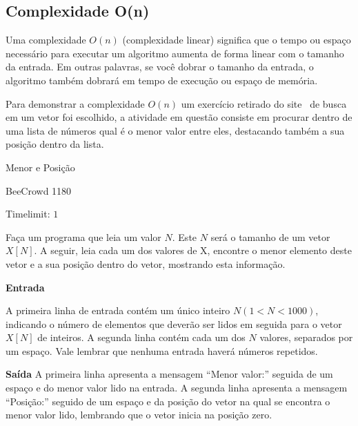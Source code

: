 \subsection{Complexidade O(n)}
Uma complexidade $O(n)$ (complexidade linear) significa que o tempo ou espaço necessário para executar um algoritmo aumenta de forma linear com o tamanho da entrada. Em outras palavras, se você dobrar o tamanho da entrada, o algoritmo também dobrará em tempo de execução ou espaço de memória.

Para demonstrar a complexidade $O(n)$ um exercício retirado do site~\cite{beecrowd1} de busca em um vetor foi escolhido, a atividade em questão consiste em procurar dentro de uma lista de números qual é o menor valor entre eles, destacando também a sua posição dentro da lista.

\begin{center}
\large Menor e Posição

{ BeeCrowd 1180}

Timelimit: $1$	
\end{center}

Faça um programa que leia um valor $N$. Este $N$ será o tamanho de um vetor $X[N]$. A seguir, leia cada um dos valores de X, encontre o menor elemento deste vetor e a sua posição dentro do vetor, mostrando esta informação.

\vspace{0.3cm}
\textbf{Entrada}

A primeira linha de entrada contém um único inteiro $N (1 < N < 1000)$, indicando o número de elementos que deverão ser lidos em seguida para o vetor $X[N]$ de inteiros. A segunda linha contém cada um dos $N$ valores, separados por um espaço. Vale lembrar que nenhuma entrada haverá números repetidos.

\vspace{0.3cm}
\textbf{Saída}
A primeira linha apresenta a mensagem “Menor valor:” seguida de um espaço e do menor valor lido na entrada. A segunda linha apresenta a mensagem “Posição:” seguido de um espaço e da posição do vetor na qual se encontra o menor valor lido, lembrando que o vetor inicia na posição zero.

